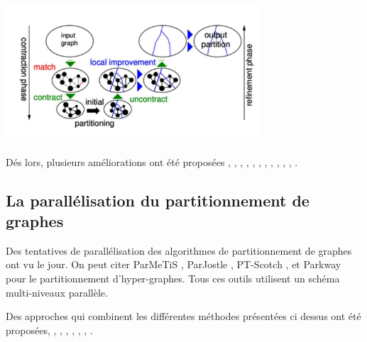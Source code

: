 	\begin{center}
		\includegraphics[height=2in]{img/multiniveaupartitionnement.PNG}		
		 \label{pmn}
	\end{center}
Dés lors, plusieurs améliorations ont été proposées \citep{Aurora2007}, \citep{ChevalierSafro2009}, \citep{KalayciBattiti2018}, \citep{Karypis2003}, \citep{KarypisKumar1998}, \citep{Monien2000}, \citep{Pellegrini1995}, \citep{Pope2016}, \citep{Predari2017}, \citep{Safro2015}, \citep{SandersSchulz2011}, \citep{Talu2017}.


\subsection*{La parallélisation du partitionnement de graphes}
Des tentatives de parallélisation des algorithmes de partitionnement de graphes ont vu le jour. On peut citer ParMeTiS \citep{Karypis2011}, ParJostle \citep{Walshaw2012}, PT-Scotch \citep{ChevalierPellegrini2008}, et Parkway \citep{TrifunovicKnottenbelt2004} pour le partitionnement d'hyper-graphes. Tous ces outils utilisent un schéma multi-niveaux parallèle.

Des approches qui combinent les différentes méthodes présentées ci dessus ont été proposées, \citep{Chan2016}, \citep{LaSalleKarypis2013}, \citep{LaSalleKarypis2015}, \citep{LengYu2007}, \citep{Rahimian2013}, \citep{SandersSchulz2012}, \citep{Tashkova2011}.


